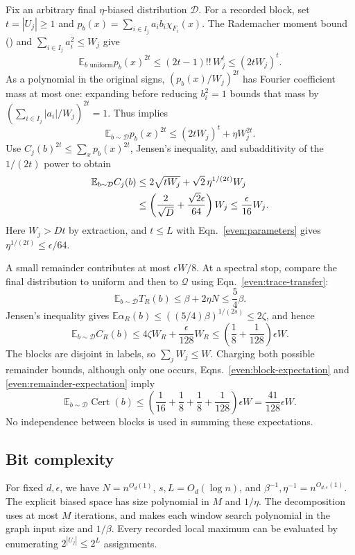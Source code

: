\documentclass[letterpaper,11pt]{article}
\theoremstyle{definition}
\newcommand{\E}{\mathbb E}
\newcommand{\abs}[1]{\left|#1\right|}
\begin{document}
Fix an arbitrary final $\eta$-biased distribution $\mathcal D$.
For a recorded block, set $t=\abs{U_j}\geq1$ and
$p_b(x)=\sum_{i\in I_j}a_i b_i\chi_{F_i}(x)$.
The Rademacher moment bound () and
$\sum_{i\in I_j}a_i^2\leq W_j$ give
\[
 \E_{b\text{ uniform}}p_b(x)^{2t}
 \leq(2t-1)!!\,W_j^t\leq(2tW_j)^t.
\]
As a polynomial in the original signs, $(p_b(x)/W_j)^{2t}$ has
Fourier coefficient mass at most one: expanding before reducing
$b_i^2=1$ bounds that mass by
$(\sum_{i\in I_j}\abs{a_i}/W_j)^{2t}=1$.
Thus  implies
\[
 \E_{b\sim\mathcal D}p_b(x)^{2t}
 \leq(2tW_j)^t+\eta W_j^{2t}.
\]
Use $C_j(b)^{2t}\leq\sum_x p_b(x)^{2t}$, Jensen's inequality,
and subadditivity of the $1/(2t)$ power to obtain
\begin{align}
 \E_{b\sim\mathcal D}C_j(b)
 &\leq 2\sqrt{tW_j}+\sqrt2\,\eta^{1/(2t)}W_j\notag\\
 &\leq\left(\frac{2}{\sqrt D}
              +\frac{\sqrt2\epsilon}{64}\right)W_j
 \leq\frac{\epsilon}{16}W_j.
 \label{even:block-expectation}
\end{align}
Here $W_j>Dt$ by extraction, and $t\leq L$ with
Eqn.~\eqref{even:parameters} gives
$\eta^{1/(2t)}\leq\epsilon/64$.

A small remainder contributes at most $\epsilon W/8$.
At a spectral stop, compare the final distribution to uniform and
then to $\mathcal Q$ using Eqn.~\eqref{even:trace-transfer}:
\[
 \E_{b\sim\mathcal D}T_R(b)
 \leq\beta+2\eta N\leq\frac54\beta.
\]
Jensen's inequality gives
$\E\alpha_R(b)\leq((5/4)\beta)^{1/(2s)}\leq2\zeta$, and hence
\begin{equation}\label{even:remainder-expectation}
 \E_{b\sim\mathcal D}C_R(b)
 \leq4\zeta W_R+\frac{\epsilon}{128}W_R
 \leq\left(\frac18+\frac1{128}\right)\epsilon W.
\end{equation}
The blocks are disjoint in labels, so $\sum_jW_j\leq W$.
Charging both possible remainder bounds, although only one occurs,
Eqns.~\eqref{even:block-expectation} and
\eqref{even:remainder-expectation} imply
\[
 \E_{b\sim\mathcal D}\operatorname{Cert}(b)
 \leq\left(\frac1{16}+\frac18+\frac18+\frac1{128}\right)
       \epsilon W
 =\frac{41}{128}\epsilon W.
\]
No independence between blocks is used in summing these expectations.

\subsection{Bit complexity}

For fixed $d,\epsilon$, we have $N=n^{O_d(1)}$, $s,L=O_d(\log n)$,
and $\beta^{-1},\eta^{-1}=n^{O_{d,\epsilon}(1)}$.
The explicit biased space has size polynomial in $M$ and $1/\eta$.
The decomposition uses at most $M$ iterations, and
 makes each window search polynomial in the graph
input size and $1/\beta$. Every recorded local maximum can be evaluated
by enumerating $2^{\abs{U_j}}\leq2^L$ assignments.
\end{document}
